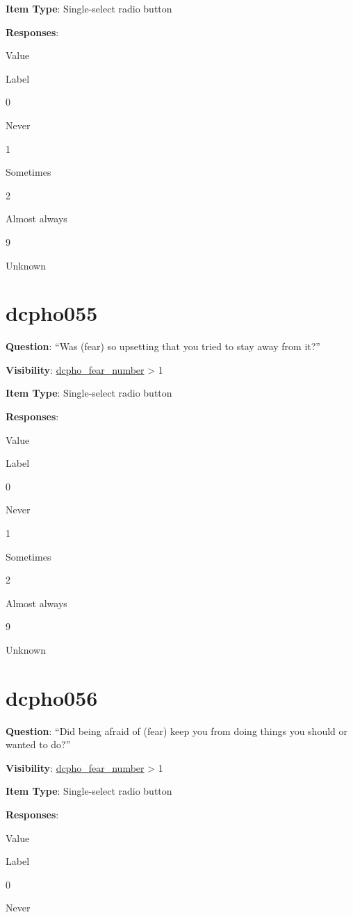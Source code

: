 \documentclass[]{book}
\begin{document}
\textbf{Item Type}: Single-select radio button

\textbf{Responses}:

Value

Label

0

Never

1

Sometimes

2

Almost always

9

Unknown

\hypertarget{dcpho055}{%
\section{dcpho055}\label{dcpho055}}

\textbf{Question}: ``Was (fear) so upsetting that you tried to stay away from it?''

\textbf{Visibility}: \protect\hyperlink{dcpho_fear_number}{dcpho\_fear\_number} \textgreater{} 1

\textbf{Item Type}: Single-select radio button

\textbf{Responses}:

Value

Label

0

Never

1

Sometimes

2

Almost always

9

Unknown

\hypertarget{dcpho056}{%
\section{dcpho056}\label{dcpho056}}

\textbf{Question}: ``Did being afraid of (fear) keep you from doing things you should or wanted to do?''

\textbf{Visibility}: \protect\hyperlink{dcpho_fear_number}{dcpho\_fear\_number} \textgreater{} 1

\textbf{Item Type}: Single-select radio button

\textbf{Responses}:

Value

Label

0

Never
\end{document}
